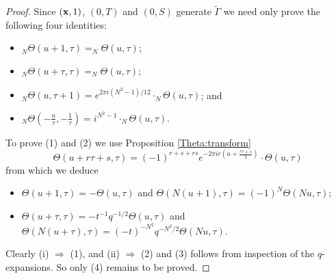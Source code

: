 \documentclass[12pt,amstex,amssymb]{article}
\theoremstyle{plain}
\theoremstyle{definition}
\def\bx {{\bf x}}
\begin{document}
\begin{proof}
	Since $(\bx, 1)$, $(0,T)$ and $(0,S)$ generate $\tilde\Gamma$ we need only prove the following four identities:
	\begin{itemize}
		\item[\rm (1)]  $_{N}\!\Theta\left(u + 1,\tau\right)= _{N}\!\Theta(u,\tau)$;
		\item[\rm (2)]  $_{N}\!\Theta\left(u + \tau ,\tau\right)= _{N}\!\Theta(u,\tau)$;
		\item[\rm (3)]  $_{N}\!\Theta\left(u,\tau+1\right)=e^{2\pi i (N^2-1)/12}\cdot_{N}\!\Theta(u,\tau)$; and
		\item[\rm (4)]  $_{N}\!\Theta\left(-\frac{u}{\tau},-\frac{1}{\tau} \right)= i^{N^2-1}\cdot_{N}\!\Theta(u,\tau)$.
	\end{itemize}
	
	To prove (1) and (2) we use Proposition {\ref{Theta:transform}}
	$$
	\Theta(u+r \tau + s,\tau) = (-1)^{r+s+rs}e^{-2\pi i r(u+\frac{r\tau+s}{2})}\cdot \Theta(u,\tau)
	$$
	from which we deduce 
	\begin{itemize}
		\item[\rm (i)] $\Theta(u+1,\tau) = -\Theta(u,\tau)$ and $\Theta(N(u+1),\tau) = (-1)^N\Theta(Nu,\tau)$; 
		\item[\rm (ii)] $\Theta(u+\tau,\tau) = -t^{-1}q^{-1/2}\Theta(u,\tau)$  and  $\Theta(N(u+\tau),\tau) = (-t)^{-N^2}q^{-N^2/2}\Theta(Nu,\tau)$.
	\end{itemize}
	Clearly (i) $\Longrightarrow$ (1), and (ii) $\Longrightarrow$ (2) and (3) follows from inspection of the $q$-expansions.  So only (4) remains to be proved.
	

\end{proof}
\end{document}
